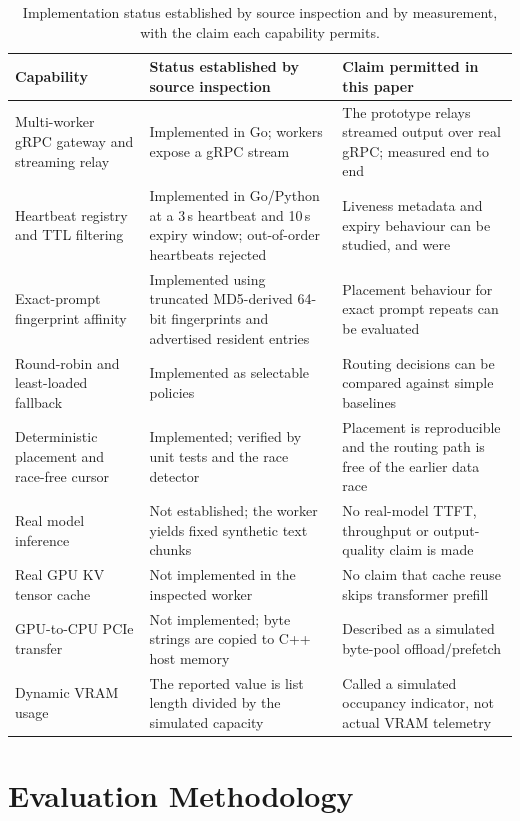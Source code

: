 \documentclass[10pt,twocolumn]{article}
\begin{document}
\begin{table}[t]
\centering
\caption{Implementation status established by source inspection and by
measurement, with the claim each capability permits.}
\label{tab:status}
\setlength{\tabcolsep}{3pt}
\begin{tabular}{p{}p{}p{}}
\toprule
\textbf{Capability} & \textbf{Status established by source inspection} & \textbf{Claim permitted in this paper} \\
\midrule
Multi-worker gRPC gateway and streaming relay & Implemented in Go; workers expose a gRPC stream & The prototype relays streamed output over real gRPC; measured end to end \\
Heartbeat registry and TTL filtering & Implemented in Go/Python at a 3\,s heartbeat and 10\,s expiry window; out-of-order heartbeats rejected & Liveness metadata and expiry behaviour can be studied, and were \\
Exact-prompt fingerprint affinity & Implemented using truncated MD5-derived 64-bit fingerprints and advertised resident entries & Placement behaviour for exact prompt repeats can be evaluated \\
Round-robin and least-loaded fallback & Implemented as selectable policies & Routing decisions can be compared against simple baselines \\
Deterministic placement and race-free cursor & Implemented; verified by unit tests and the race detector & Placement is reproducible and the routing path is free of the earlier data race \\
Real model inference & Not established; the worker yields fixed synthetic text chunks & No real-model TTFT, throughput or output-quality claim is made \\
Real GPU KV tensor cache & Not implemented in the inspected worker & No claim that cache reuse skips transformer prefill \\
GPU-to-CPU PCIe transfer & Not implemented; byte strings are copied to C++ host memory & Described as a simulated byte-pool offload/prefetch \\
Dynamic VRAM usage & The reported value is list length divided by the simulated capacity & Called a simulated occupancy indicator, not actual VRAM telemetry \\
\bottomrule
\end{tabular}
\end{table}

\section{Evaluation Methodology}
\end{document}
